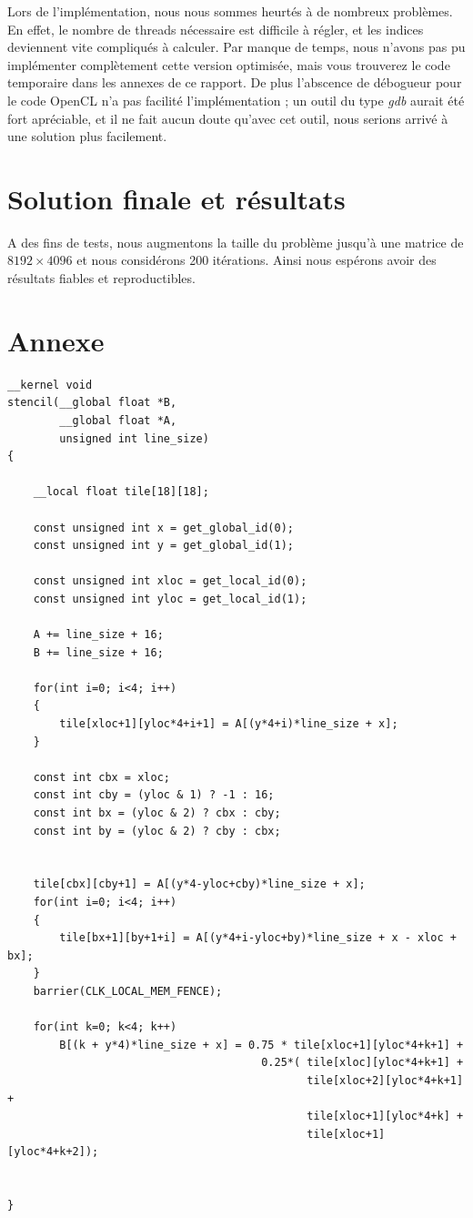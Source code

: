 \documentclass{article}
\begin{document}
Lors de l'implémentation, nous nous sommes heurtés à de nombreux problèmes. En effet, le nombre de threads nécessaire est difficile à régler, et les indices deviennent vite compliqués à calculer.
Par manque de temps, nous n'avons pas pu implémenter complètement cette version optimisée, mais vous trouverez le code temporaire dans les annexes de ce rapport.
De plus l'abscence de débogueur pour le code OpenCL n'a pas facilité l'implémentation ; un outil du type \textit{gdb} aurait été fort apréciable, et il ne fait aucun doute qu'avec cet outil, nous serions arrivé à une solution plus facilement.

\section{Solution finale et résultats}

A des fins de tests, nous augmentons la taille du problème jusqu'à une matrice de $8192\times4096$ et nous considérons 200 itérations.
Ainsi nous espérons avoir des résultats fiables et reproductibles.









\section*{Annexe}

\begin{verbatim}
__kernel void
stencil(__global float *B,
        __global float *A,
        unsigned int line_size)
{

    __local float tile[18][18];

    const unsigned int x = get_global_id(0);
    const unsigned int y = get_global_id(1);

    const unsigned int xloc = get_local_id(0);
    const unsigned int yloc = get_local_id(1);

    A += line_size + 16;
    B += line_size + 16;

    for(int i=0; i<4; i++)
    {
        tile[xloc+1][yloc*4+i+1] = A[(y*4+i)*line_size + x];
    }

    const int cbx = xloc;
    const int cby = (yloc & 1) ? -1 : 16;
    const int bx = (yloc & 2) ? cbx : cby;
    const int by = (yloc & 2) ? cby : cbx;


    tile[cbx][cby+1] = A[(y*4-yloc+cby)*line_size + x];
    for(int i=0; i<4; i++)
    {
        tile[bx+1][by+1+i] = A[(y*4+i-yloc+by)*line_size + x - xloc + bx];
    }
    barrier(CLK_LOCAL_MEM_FENCE);

    for(int k=0; k<4; k++)
        B[(k + y*4)*line_size + x] = 0.75 * tile[xloc+1][yloc*4+k+1] +
                                       0.25*( tile[xloc][yloc*4+k+1] +
                                              tile[xloc+2][yloc*4+k+1] +
                                              tile[xloc+1][yloc*4+k] +
                                              tile[xloc+1][yloc*4+k+2]);


}
\end{verbatim}
\end{document}
